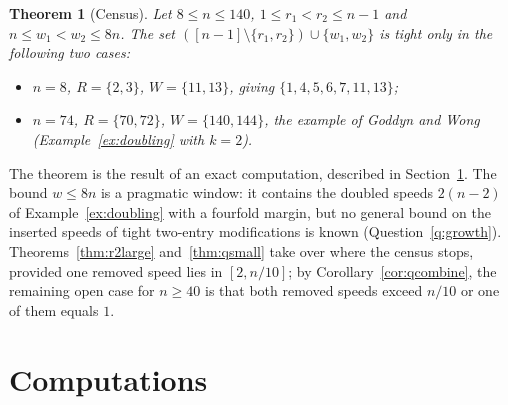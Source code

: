 \documentclass[11pt]{article}
\newtheorem{theorem}{Theorem}[section]
\theoremstyle{definition}
\begin{document}
\begin{theorem}[Census]\label{thm:twoswap}
Let $8\le n\le140$, $1\le r_1<r_2\le n-1$ and $n\le w_1<w_2\le8n$. The
set $([n-1]\setminus\{r_1,r_2\})\cup\{w_1,w_2\}$ is tight only in the
following two cases:
\begin{itemize}
\item $n=8$, $R=\{2,3\}$, $W=\{11,13\}$, giving $\{1,4,5,6,7,11,13\}$;
\item $n=74$, $R=\{70,72\}$, $W=\{140,144\}$, the example of Goddyn and
Wong (Example~\ref{ex:doubling} with $k=2$).
\end{itemize}
\end{theorem}

The theorem is the result of an exact computation, described in
Section~\ref{sec:comp}. The bound $w\le8n$ is a pragmatic window: it
contains the doubled speeds $2(n-2)$ of Example~\ref{ex:doubling} with
a fourfold margin, but no general bound on the inserted speeds of tight
two-entry modifications is known (Question~\ref{q:growth}).
Theorems~\ref{thm:r2large} and~\ref{thm:qsmall} take over where the
census stops, provided one removed speed lies in $[2,n/10]$; by
Corollary~\ref{cor:qcombine}, the remaining open case for $n\ge40$ is
that both removed speeds exceed $n/10$ or one of them equals $1$.

\section{Computations}\label{sec:comp}
\end{document}
